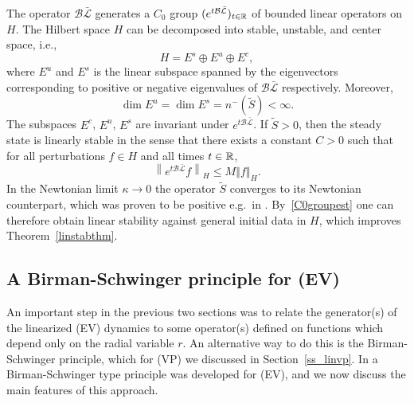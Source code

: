 \documentclass[11pt]{article}
\begin{document}
The operator $\mathcal{B}\bar{\mathcal{L}}$
generates a $C_{0}$ group $(e^{t\mathcal{B}\bar{\mathcal{L}}})_{t\in \mathbb R}$
of bounded linear operators on $H$. The Hilbert space $H$ can
be decomposed into stable, unstable, and center space, i.e.,
\[
H=E^{s}\oplus E^{u}\oplus E^{c}, 
\]
where $E^{u}$ and $E^{s}$ is the linear subspace spanned by the
eigenvectors corresponding to
positive or negative eigenvalues of
$\mathcal{B}\bar{\mathcal{L}}$ respectively. Moreover,
\[
\dim E^{u}=\dim E^{s}=n^{-} ( \tilde{S}) <\infty .
\]
The subspaces $E^{c}$, $E^{u}$, $E^{s}$ are invariant under
$e^{t\mathcal{B}\bar{\mathcal{L}}}$.
If $\tilde{S}>0$, then the
steady state is linearly stable in the sense that there exists a
constant $C>0$ such that for all perturbations
$f\in H$ and all times $t\in \mathbb R$,
\begin{equation} \label{C0groupest}
  \left\| e^{t\mathcal{B}\bar{\mathcal{L}}}f\right\|_{H}
  \leq M\left\Vert f\right\Vert_{H}.
\end{equation}
In the Newtonian limit $\kappa\to 0$
the operator $\tilde{S}$
converges to its Newtonian counterpart, which was
proven to be positive e.g.\ in \cite{GuoLin}. 
By~\eqref{C0groupest} one can therefore obtain
linear stability against general initial data in $H$,
which improves Theorem~\ref{linstabthm}.
%
%
\subsection{A Birman-Schwinger principle for (EV)}
\label{bsev}
%
An important step in the previous two sections was to relate
the generator(s) of the linearized (EV) dynamics to some
operator(s) defined on functions which depend only on the
radial variable $r$. An alternative way to do this is the
Birman-Schwinger principle, which for (VP) we discussed
in Section~\ref{ss_linvp}. In \cite{GueStrRe} a Birman-Schwinger
type principle was developed for (EV), and we now discuss the main features
of this approach.
\end{document}
